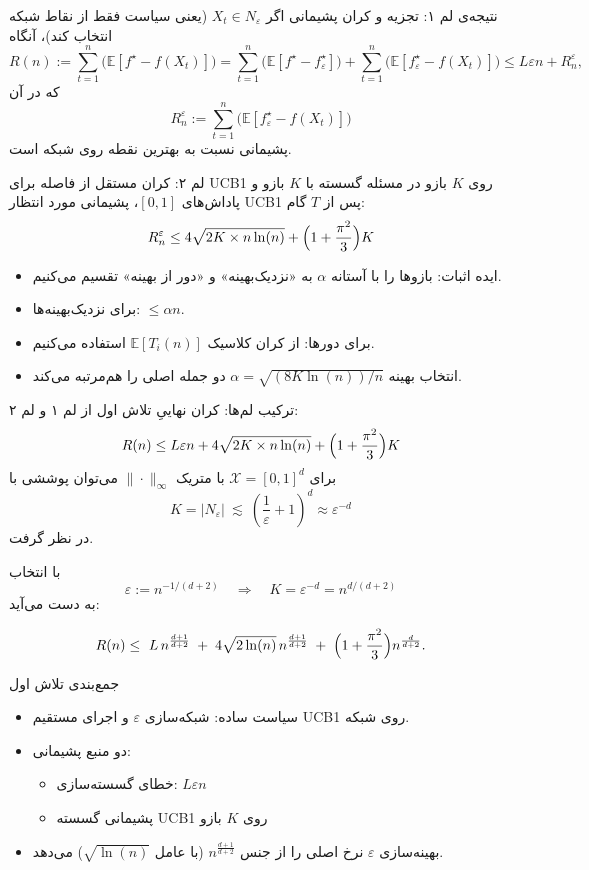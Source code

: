 \documentclass[aspectratio=169]{beamer}
\newcommand{\E}{\mathbb{E}}
\newcommand{\cX}{\mathcal{X}}
\newcommand{\eps}{\varepsilon}
\begin{document}
\begin{frame}{نتیجه‌ی لم ۱: تجزیه و کران پشیمانی}
اگر $X_t\in N_\eps$ (یعنی سیاست فقط از نقاط شبکه انتخاب کند)، آنگاه
\[
R(n):=\sum_{t=1}^n\bigl(\E[f^\star-f(X_t)]\bigr)
=
\sum_{t=1}^n\bigl(\E[f^\star-f^\star_\eps]\bigr)
+
\sum_{t=1}^n\bigl(\E[f^\star_\eps-f(X_t)]\bigr)
\le
L\eps n + R_n^\eps,
\]
که در آن
\[
R_n^\eps:=\sum_{t=1}^n\bigl(\E[f^\star_\eps-f(X_t)]\bigr)
\]
پشیمانی نسبت به بهترین نقطه روی شبکه است.
\end{frame}


\begin{frame}{لم ۲: کران مستقل از فاصله برای UCB1 روی $K$ بازو}
در مسئله گسسته با $K$ بازو و پاداش‌های $[0,1]$، پشیمانی مورد انتظار UCB1 پس از $T$ گام:
\[
R_n^\eps\le 4\sqrt{2K \times n\ln (n)}+\Bigl(1+\frac{\pi^2}{3}\Bigr)K
\]
\begin{itemize}
  \item ایده اثبات: بازوها را با آستانه $\alpha$ به «نزدیک‌بهینه» و «دور از بهینه» تقسیم می‌کنیم.
  \item برای نزدیک‌بهینه‌ها: $\le \alpha n$.
  \item برای دورها: از کران کلاسیک $\E[T_i(n)]$ استفاده می‌کنیم.
  \item انتخاب بهینه $\alpha=\sqrt{(8K\ln (n))/n}$ دو جمله اصلی را هم‌مرتبه می‌کند.
\end{itemize}
\end{frame}

\begin{frame}{ترکیب لم‌ها: کران نهاییِ تلاش اول}
از لم ۱ و لم ۲:
\[
R(n)\le L\eps n + 4\sqrt{2K \times n\ln (n)}+\Bigl(1+\frac{\pi^2}{3}\Bigr)K
\]
برای $\cX=[0,1]^d$ با متریک $\|\cdot\|_\infty$ می‌توان پوششی با
\[
K=|N_\eps|\ \lesssim\ \left(\frac{1}{\eps}+1\right)^d \approx \eps^{-d}
\]
در نظر گرفت.

با انتخاب
\[
\eps:=n^{-1/(d+2)}\quad\Rightarrow\quad K=\eps^{-d}=n^{d/(d+2)}
\]
به دست می‌آید:
\begin{tcolorbox}[colback=yellow, colframe=blue!70!black, boxrule=0.8pt,
                  left=6pt,right=6pt,top=6pt,bottom=6pt]
\[
R(n) \le\ L\,n^{\frac{d+1}{d+2}}
\;+\;4\sqrt{2\ln (n)}\,n^{\frac{d+1}{d+2}}
\;+\;\Bigl(1+\frac{\pi^2}{3}\Bigr)n^{\frac{d}{d+2}} .
\]
\end{tcolorbox}
\end{frame}

\begin{frame}{جمع‌بندی تلاش اول}
\begin{itemize}
  \item سیاست ساده: شبکه‌سازی $\eps$ و اجرای مستقیم UCB1 روی شبکه.
  \item دو منبع پشیمانی:
  \begin{itemize}
    \item خطای گسسته‌سازی: $L\eps n$
    \item پشیمانی گسسته UCB1 روی $K$ بازو
  \end{itemize}
  \item بهینه‌سازی $\eps$ نرخ اصلی را از جنس $n^{\frac{d+1}{d+2}}$ (با عامل $\sqrt{\ln (n)}$) می‌دهد.
\end{itemize}
\end{frame}
\end{document}
